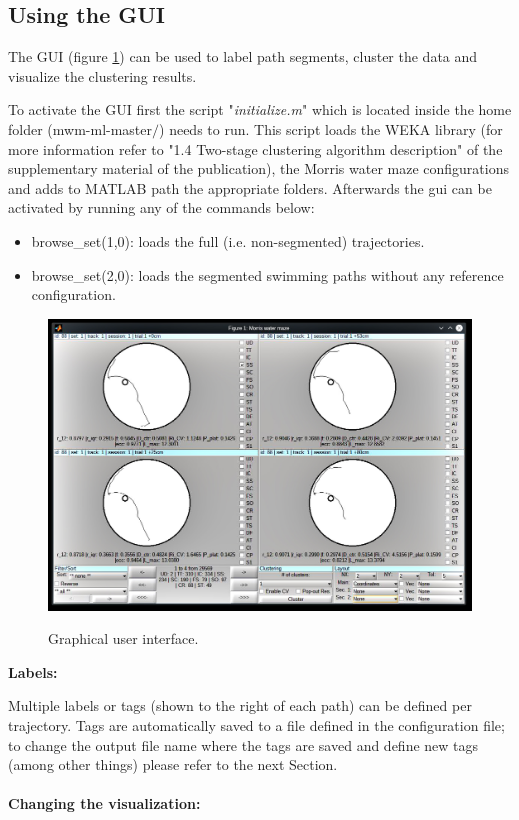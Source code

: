 \documentclass[12pt,titlepage]{article}
\begin{document}
\begin{doublespace}
\subsection{Using the GUI}

The GUI (figure \ref{gui}) can be used to label path segments, cluster the data and visualize the clustering results.

To activate the GUI first the script "\textit{initialize.m}" which is located inside the home folder (mwm-ml-master$/$) needs to run. This script loads the WEKA library (for more information refer to "1.4 Two-stage clustering algorithm description" of the supplementary material of the publication), the Morris water maze configurations and adds to MATLAB path the appropriate folders. Afterwards the gui can be activated by running any of the commands below:
\begin{itemize}
	\item browse\_set(1,0): loads the full (i.e. non-segmented) trajectories.
	\item browse\_set(2,0): loads the segmented swimming paths without any reference configuration.
\end{itemize}

\begin{figure}[H]
	\begin{center}
		\includegraphics[width=1\textwidth]{gui.jpg}\\
		\caption [gui]{Graphical user interface.}\label{gui}
	\end{center}
\end{figure}

\noindent\textbf{Labels:}

Multiple labels or tags (shown to the right of each path) can be defined per trajectory. Tags are automatically saved to a file defined in the configuration file; to change the output file name where the tags are saved and define new tags (among other things) please refer to the next Section.
\\
\\
\noindent\textbf{Changing the visualization:}


\end{doublespace}
\end{document}
